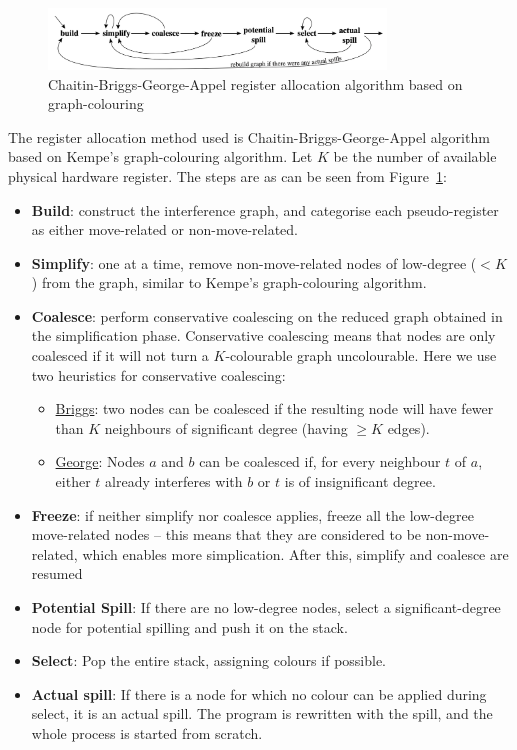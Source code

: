 \documentclass[nonacm, acmsmall, screen, 10pt]{acmart}
\begin{document}
\begin{figure}[htpb]
  \centering
  \includegraphics[width=0.8\textwidth]{regallocgraph}
  \caption{Chaitin-Briggs-George-Appel register allocation algorithm based on graph-colouring}
  \label{fig:regallocgraph}
\end{figure}

The register allocation method used is Chaitin-Briggs-George-Appel algorithm based on Kempe's graph-colouring algorithm.
Let $K$ be the number of available physical hardware register.
The steps are as can be seen from Figure~\ref{fig:regallocgraph}:
\begin{itemize}
  \item \textbf{Build}: construct the interference graph, and categorise each pseudo-register as either move-related or non-move-related.
  \item \textbf{Simplify}: one at a time, remove non-move-related nodes of low-degree ($< K$) from the graph, similar to Kempe's graph-colouring algorithm.
  \item \textbf{Coalesce}: perform conservative coalescing on the reduced graph obtained in the simplification phase.
        Conservative coalescing means that nodes are only coalesced if it will not turn a $K$-colourable graph uncolourable.
        Here we use two heuristics for conservative coalescing:
        \begin{itemize}
          \item \underline{Briggs}: two nodes can be coalesced if the resulting node will have fewer than $K$ neighbours of significant degree (having $\geq K$ edges).
          \item \underline{George}: Nodes $a$ and $b$ can be coalesced if, for every neighbour $t$ of $a$, either $t$ already interferes with $b$ or $t$ is of insignificant degree.
        \end{itemize}
  \item \textbf{Freeze}: if neither simplify nor coalesce applies, freeze all the low-degree move-related nodes -- this means that they are considered to be non-move-related, which enables more simplication.
        After this, simplify and coalesce are resumed
  \item \textbf{Potential Spill}: If there are no low-degree nodes, select a significant-degree node for potential spilling and push it on the stack.
  \item \textbf{Select}: Pop the entire stack, assigning colours if possible.
  \item \textbf{Actual spill}: If there is a node for which no colour can be applied during select, it is an actual spill.
        The program is rewritten with the spill, and the whole process is started from scratch.
\end{itemize}
\end{document}
